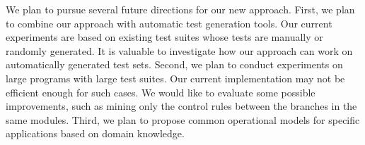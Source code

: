 \documentclass{sig-alternate}
\begin{document}
We plan to pursue several future directions for our new approach.
First, we plan to combine our approach with automatic test
generation tools. Our current experiments are based on existing test
suites whose tests are manually or randomly generated. It is
valuable to investigate how our approach can work on automatically
generated test sets. Second, we plan to conduct experiments on large
programs with large test suites. Our current implementation may not
be efficient enough for such cases. We would like to evaluate some
possible improvements, such as mining only the control rules between
the branches in the same modules. Third, we plan to propose common
operational models for specific applications based on domain
knowledge.







\end{document}
